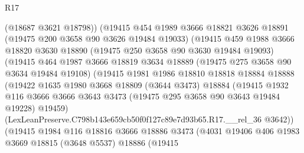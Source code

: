 \begin{lexlean}{R17}
\begin{coremodule}
                        (@18687 @3621 @18798))
                      (@19415
                        @454
                        @1989
                        @3666
                        @18821
                        @3626
                        @18891
                        (@19475 @200 @3658 @90 @3626 @19484 @19033)
                        (@19415
                          @459
                          @1988
                          @3666
                          @18820
                          @3630
                          @18890
                          (@19475 @250 @3658 @90 @3630 @19484 @19093)
                          (@19415
                            @464
                            @1987
                            @3666
                            @18819
                            @3634
                            @18889
                            (@19475 @275 @3658 @90 @3634 @19484 @19108)
                            (@19415
                              @1981
                              @1986
                              @18810
                              @18818
                              @18884
                              @18888
                              (@19422
                                @1635
                                @1980
                                @3668
                                @18809
                                (@3644 @3473)
                                @18884
                                (@19415
                                  @1932
                                  @116
                                  @3666
                                  @3666
                                  @3643
                                  @3473
                                  (@19475 @295 @3658 @90 @3643 @19484 @19228)
                                  @19459)
                                (LexLeanPreserve.C798b143e659cb50f0f127c89e7d93b65.R17.__rel_36
                                  @3642))
                              (@19415
                                @1984
                                @116
                                @18816
                                @3666
                                @18886
                                @3473
                                (@4031
                                  @19406
                                  @406
                                  @1983
                                  @3669
                                  @18815
                                  (@3648 @5537)
                                  @18886
                                  (@19415

\end{coremodule}
\end{lexlean}
